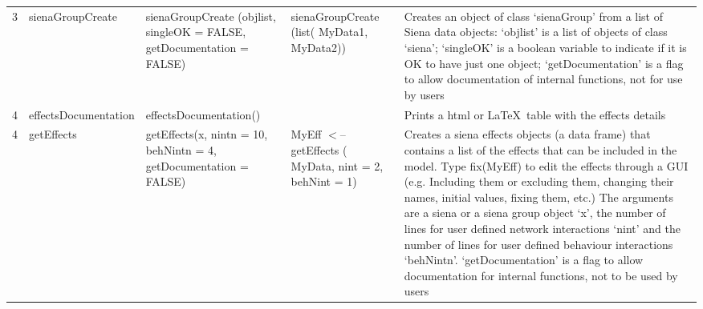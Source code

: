 \documentclass[a4paper,fleqn,11pt]{article}
\newcommand{\+}{\, + \,}
\begin{document}
\begin{landscape}
\begin{small}
\begin{longtable}{c | p{3.8cm} | p{4.5cm} | p{4.0cm} | p{7.4cm} }
3 & sienaGroupCreate & sienaGroupCreate (objlist, \newline
singleOK = FALSE, \newline
getDocumentation = FALSE) & sienaGroupCreate (list( \newline
MyData1, MyData2)) & Creates
an object of class `sienaGroup' from a list of Siena data objects:
`objlist' is a list of objects of class `siena'; `singleOK' is a boolean
variable to indicate if it is OK to have just one object; `getDocumentation'
is a flag to  allow documentation of internal functions, not for use by users\\

4 & effectsDocumentation & 

effectsDocumentation() & & Prints a html or
\LaTeX\ table with the  effects details\\
\hline

4 & getEffects& getEffects(x, nintn = 10, \newline
behNintn = 4, \newline
getDocumentation = FALSE) &
MyEff $<$-- getEffects (\newline
MyData, nint = 2, \newline
behNint = 1) & Creates a siena effects
objects (a data frame) that contains a list of the effects that can be included
in the model.  Type fix(MyEff) to edit the effects through a GUI (e.g.
Including them or excluding them, changing their names, initial values, fixing
them, etc.) The arguments are a siena or a siena group object `x', the number
of lines for user defined network interactions `nint' and the number of lines
for user defined behaviour interactions `behNintn'. `getDocumentation' is a
flag to allow documentation for
internal functions, not to  be used by users\\
\hline


\end{longtable}
\end{small}
\end{landscape}
\end{document}
